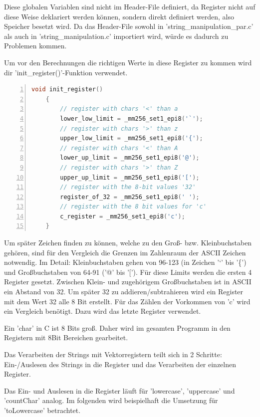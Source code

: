 \documentclass[plainarticle,zihtitle,german,final,hyperref,utf8]{zihpub}
\begin{document}
Diese globalen Variablen sind nicht im Header-File definiert, da Register nicht auf diese Weise deklariert werden können, sondern direkt definiert werden, also Speicher besetzt wird. Da das Header-File sowohl in 'string\_manipulation\_par.c' als auch in 'string\_manipulation.c' importiert wird, würde es dadurch zu Problemen kommen.

Um vor den Berechnungen die richtigen Werte in diese Register zu kommen wird dir 'init\_register()'-Funktion verwendet.

\begin{lstlisting}[language=c, numbers=left]
	void init_register()
	{
		// register with chars '<' than a
		lower_low_limit = _mm256_set1_epi8('`');
		// register with chars '>' than z
		upper_low_limit = _mm256_set1_epi8('{');
		// register with chars '<' than A
		lower_up_limit = _mm256_set1_epi8('@');
		// register with chars '>' than Z
		upper_up_limit = _mm256_set1_epi8('[');
		// register with the 8-bit values '32'
		register_of_32 = _mm256_set1_epi8(' ');
		// register with the 8 bit values for 'c'
		c_register = _mm256_set1_epi8('c');
	}
\end{lstlisting}

Um später Zeichen finden zu können, welche zu den Groß- bzw. Kleinbuchstaben gehören, sind für den Vergleich die Grenzen im Zahlenraum der ASCII Zeichen notwendig. Im Detail: Kleinbuchstaben gehen von 96-123 (in Zeichen '`' bis '\{') und Großbuchstaben von 64-91 ('@' bis '{[}'). Für diese Limits werden die ersten 4 Register gesetzt. Zwischen Klein- und zugehörigem Großbuchstaben ist in ASCII ein Abstand von 32. Um später 32 zu addieren/subtrahieren wird ein Register mit dem Wert 32 alle 8 Bit erstellt. Für das Zählen der Vorkommen von 'c' wird ein Vergleich benötigt. Dazu wird das letzte Register verwendet.

Ein 'char' in C ist 8 Bits groß. Daher wird im gesamten Programm in den Registern mit 8Bit Bereichen gearbeitet.

Das Verarbeiten der Strings mit Vektorregistern teilt sich in 2 Schritte: Ein-/Auslesen des Strings in die Register und das Verarbeiten der einzelnen Register.

Das Ein- und Auslesen in die Register läuft für 'lowercase', 'uppercase' und 'countChar' analog. Im folgenden wird beispielhaft die Umsetzung für 'toLowercase' betrachtet.
\end{document}
